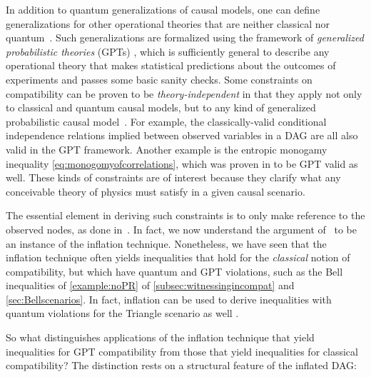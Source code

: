 \documentclass[aps,english,superscriptaddress,onecolumn,twoside,longbibliography,pra,floatfix,fleqn,nofootinbib]{revtex4-1}%
\theoremstyle{definition}
\begin{document}

In addition to quantum generalizations of causal models, one can define generalizations for other operational theories that are neither classical nor quantum~\cite{pusey2014gdag,BeyondBellII}.
Such generalizations are formalized using the framework of {\em generalized probabilistic theories} (GPTs) \cite{Barnum2012GPT,Janotta2014GPT}, which is sufficiently general to describe any operational theory that makes statistical predictions about the outcomes of experiments and passes some basic sanity checks.  Some constraints on compatibility can be proven to be \emph{theory-independent} in that they apply not only to classical and quantum causal models, but to any kind of generalized probabilistic causal model~\cite{pusey2014gdag}. For example, the classically-valid conditional independence relations implied between observed variables in a DAG are all also valid in the GPT framework.
Another example is the entropic monogamy inequality \cref{eq:monogomyofcorrelations}, which was proven in \cite{pusey2014gdag} to be GPT valid as well. These kinds of constraints are of interest because they clarify what any conceivable theory of physics must satisfy in a given causal scenario. 

The essential element in deriving such constraints is to only make reference to the observed nodes, as done in~\cite{pusey2014gdag}. In fact, we now understand the argument of~\cite{pusey2014gdag} to be an instance of the inflation technique. Nonetheless, we have seen that the inflation technique often yields inequalities that hold for the {\em classical} notion of compatibility, but which have quantum and GPT violations, such as the Bell inequalities of \cref{example:noPR} of \cref{subsec:witnessingincompat} and \cref{sec:Bellscenarios}. In fact, inflation can be used to derive inequalities with quantum violations for the Triangle scenario as well \cite{TC2016trianglequantum}.

So what distinguishes applications of the inflation technique that yield inequalities for GPT compatibility from those that yield inequalities for classical compatibility?   The distinction rests on a structural feature of the inflated DAG:
\end{document}
